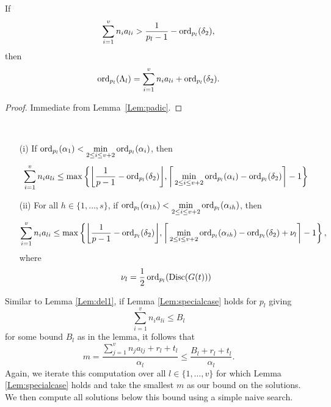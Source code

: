 \begin{lemma} \label{Lem:Lambda}
If 
\[\sum_{i = 1}^v n_{i}a_{li} > \frac{1}{p_l-1} - \operatorname{ord}_{p_l}(\delta_2),\]
then
\[\operatorname{ord}_{p_l}(\Lambda_l) = \sum_{i = 1}^v n_{i}a_{li} + \operatorname{ord}_{p_l}(\delta_2).\]
\end{lemma}

\begin{proof}
Immediate from Lemma~\ref{Lem:padic}.
\end{proof}

\begin{lemma} \label{Lem:specialcase} \
\begin{enumerate}
\item[(i)] If $\operatorname{ord}_{p_l}(\alpha_1) < \displaystyle \min_{2 \leq i \leq v+2} \operatorname{ord}_{p_l}(\alpha_i)$, then
\[\sum_{i = 1}^v n_i a_{li} \leq \max \left\{ \bigg\lfloor{\frac{1}{p-1} - \operatorname{ord}_{p_l}(\delta_2)}\bigg\rfloor,  \bigg \lceil\displaystyle \min_{2 \leq i \leq v+2} \operatorname{ord}_{p_l}(\alpha_{i}) - \operatorname{ord}_{p_l}(\delta_2) \bigg \rceil - 1 \right\}\]

\item[(ii)] For all $h \in \{1, \dots, s\}$, if $\operatorname{ord}_{p_l}(\alpha_{1h}) < \displaystyle \min_{2 \leq i \leq v+2} \operatorname{ord}_{p_l}(\alpha_{ih})$, then
\[\sum_{i = 1}^v n_i a_{li} \leq \max \left\{ \bigg\lfloor{\frac{1}{p-1} - \operatorname{ord}_{p_l}(\delta_2)}\bigg\rfloor, \bigg \lceil \displaystyle \min_{2 \leq i \leq v+2} \operatorname{ord}_{p_l}(\alpha_{ih})- \operatorname{ord}_{p_l}(\delta_2) + \nu_l \bigg \rceil - 1\right\},\]
where 
\[\nu_l = \frac{1}{2}\operatorname{ord}_{p_l}(\text{Disc}(G(t)))\]
\end{enumerate}
\end{lemma}

Similar to Lemma \ref{Lem:del1}, if Lemma \ref{Lem:specialcase} holds for $p_l$ giving
\[\sum_{i = 1}^v n_i a_{li} \leq B_l\]
for some bound $B_l$ as in the lemma, it follows that
\[m = \frac{\sum_{j = 1}^{v}n_ja_{lj} + r_l + t_l}{\alpha_l} \leq \frac{B_l + r_l + t_l}{\alpha_l}. \]
Again, we iterate this computation over all $l \in \{1, \dots, v \}$ for which Lemma \ref{Lem:specialcase} holds and take the smallest $m$ as our bound on the solutions. We then compute all solutions below this bound using a simple naive search. 

